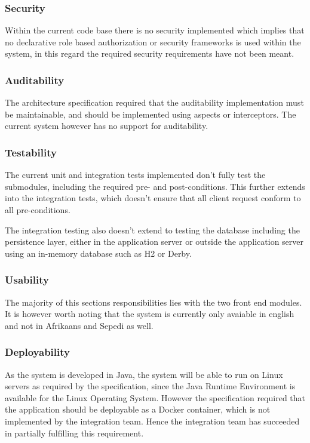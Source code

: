 \documentclass[a4paper,10pt]{article}
\begin{document}
\subsubsection{Security}
Within the current code base there is no security implemented which implies that no declarative role based authorization or security frameworks is used within the system, in this regard the required security requirements have not been meant.

\subsubsection{Auditability}
The architecture specification required that the auditability implementation must be maintainable, and should be implemented using aspects or interceptors. The current system however has no support for auditability.

\subsubsection{Testability}
The current unit and integration tests implemented don't fully test the submodules, including the required pre- and post-conditions.  This further extends into the integration tests, which doesn't ensure that all client request conform to all pre-conditions.

The integration testing also doesn't extend to testing the database including the persistence layer, either in the application server or outside the application server using an in-memory database such as H2 or Derby.

\subsubsection{Usability}
The majority of this sections responsibilities lies with the two front end modules. It is however worth noting that the system is currently only avaiable in english and not in Afrikaans and Sepedi as well.

\subsubsection{Deployability}
As the system is developed in Java, the system will be able to run on Linux servers as required by the specification, since the Java Runtime Environment is available for the Linux Operating System.  However the specification required that the application should be deployable as a Docker container,
which is not implemented by the integration team.  Hence the integration team has succeeded in partially fulfilling this requirement.
\end{document}
